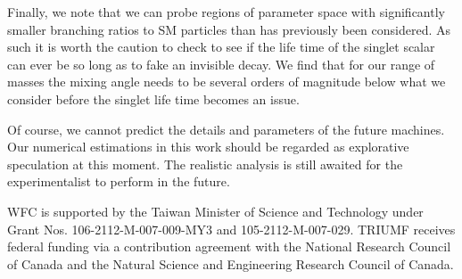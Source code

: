 \documentclass[11pt]{article}
\begin{document}
Finally, we note that we can probe regions of parameter space with significantly smaller branching ratios to SM particles than has previously been considered. As such it is worth the caution to check to see if the life time of the singlet scalar can ever be so long as to fake an invisible decay. We find that for our range of masses the mixing angle needs to be several orders of magnitude below what we consider before the singlet life time becomes an issue.

Of course, we cannot predict the details and parameters of the future machines. Our numerical estimations in this work should be regarded as explorative speculation at this moment. The realistic analysis is still awaited for the experimentalist to perform in the future.
\begin{acknowledgments}
 WFC is supported by the Taiwan Minister of Science and Technology under
Grant Nos. 106-2112-M-007-009-MY3  and 105-2112-M-007-029.
TRIUMF receives federal funding via a contribution agreement with the National Research Council of Canada and the Natural Science and Engineering Research
Council of Canada.
\end{acknowledgments}



\end{document}
